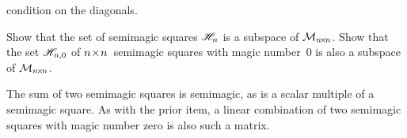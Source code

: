 \begin{exercises}
     condition on the diagonals.
     \begin{exparts*}
       \partsitem
         Show that the set of semimagic squares $\mathscr{H}_n$ 
         is a subspace of $\mathcal{M}_{n \! \times \! n}$.
       \partsitem
         Show that 
         the set $\mathscr{H}_{n,0}$  
         of $n \! \times \! n$~semimagic squares with magic number~$0$
         is also a subspace of $\mathcal{M}_{n \! \times \! n}$.
     \end{exparts*}
     \begin{answer}
       \begin{exparts*}
         \partsitem
           The sum of two semimagic squares is semimagic, as is a scalar 
           multiple of a semimagic square.
         \partsitem
           As with the prior item, a linear combination of two semimagic
           squares with magic number zero is also such a matrix.
       \end{exparts*}
     \end{answer}

\end{exercises}
